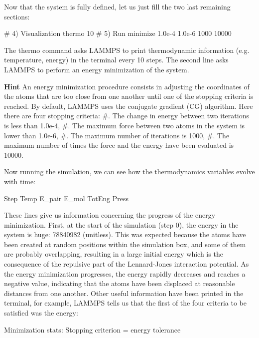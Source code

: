 Now that the system is fully defined, let us just fill the two last remaining sections:



\begin{lcverbatim}
# 4) Visualization
thermo 10
# 5) Run
minimize 1.0e-4 1.0e-6 1000 10000
\end{lcverbatim}

The thermo command asks LAMMPS to print
thermodynamic information (e.g. temperature, energy) in the
terminal every 10 steps. The second line asks LAMMPS to
perform an energy minimization of the system.


\textbf{Hint} An energy minimization procedure consists in adjusting
the coordinates of the atoms that are too close from one another until one of the stopping
criteria is reached. By default, LAMMPS uses the conjugate gradient (CG) algorithm.
Here there are four stopping criteria:
#. The change in energy between two iterations is less than 1.0e-4,
#. The maximum force between two atoms in the system is lower than 1.0e-6,
#. The maximum number of iterations is 1000,
#. The maximum number of times the force and the energy have been evaluated is 10000.


Now running the simulation, we can see how the thermodynamics
variables evolve with time:



\begin{lcverbatim}
Step         Temp       E_pair        E_mol       TotEng         Press
\end{lcverbatim}

These lines give us information concerning
the progress of the energy minimization. First, at the start
of the simulation (step 0), the energy in the system is
huge: 78840982 (unitless). This was expected because
the atoms have been created at random positions within the
simulation box, and some of them are probably overlapping,
resulting in a large initial energy which is the consequence
of the repulsive part of the Lennard-Jones interaction
potential. As the energy minimization progresses, the energy
rapidly decreases and reaches a negative value, indicating that the atoms have been
displaced at reasonable distances from one another. Other
useful information have been printed in the terminal, for
example, LAMMPS tells us that the first of the four criteria
to be satisfied was the energy:



\begin{lcverbatim}
Minimization stats:
Stopping criterion = energy tolerance
\end{lcverbatim}





